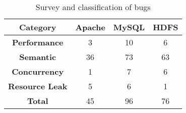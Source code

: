 \begin{table}[]
\centering
\begin{tabular}{cccc}
\toprule
\textbf{Category} & \textbf{Apache} & \textbf{MySQL} & \textbf{HDFS} \\ \midrule
\textbf{Performance} & 3 & 10 & 6 \\ 
\textbf{Semantic} & 36 & 73 & 63 \\ 
\textbf{Concurrency} & 1 & 7 & 6 \\ 
\textbf{Resource Leak} & 5 & 6 & 1 \\ \midrule
\textbf{Total} & 45 & 96 & 76 \\
\bottomrule
\end{tabular}
\caption{Survey and classification of bugs}
\label{tab:survey}
\end{table}
